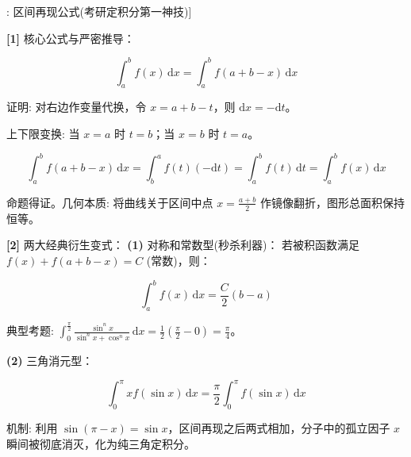 \documentclass[11pt,a4paper,UTF8]{ctexart}
\begin{document}
\begin{thmbox}[定理[3]: 区间再现公式(考研定积分第一神技)]

\textbf{[1]} 核心公式与严密推导：

\begin{equation*}
\int_a^b f(x)\,\mathrm{d}x = \int_a^b f(a+b-x)\,\mathrm{d}x
\end{equation*}


证明: 对右边作变量代换，令 $x = a+b-t$，则 $\mathrm{d}x = -\mathrm{d}t$。

上下限变换: 当 $x=a$ 时 $t=b$；当 $x=b$ 时 $t=a$。


\begin{equation*}
\int_a^b f(a+b-x)\,\mathrm{d}x = \int_b^a f(t)(-\mathrm{d}t) = \int_a^b f(t)\,\mathrm{d}t = \int_a^b f(x)\,\mathrm{d}x
\end{equation*}


命题得证。几何本质: 将曲线关于区间中点 $x = \frac{a+b}{2}$ 作镜像翻折，图形总面积保持恒等。

\textbf{[2]} 两大经典衍生变式：
\textbf{(1)}  对称和常数型(秒杀利器)：
若被积函数满足 $f(x) + f(a+b-x) = C$ (常数)，则：


\begin{equation*}
\int_a^b f(x)\,\mathrm{d}x = \frac{C}{2}(b - a)
\end{equation*}


典型考题: $\int_0^{\frac{\pi}{2}} \frac{\sin^n x}{\sin^n x + \cos^n x}\,\mathrm{d}x = \frac{1}{2}\left(\frac{\pi}{2} - 0\right) = \frac{\pi}{4}$。

\textbf{(2)}  三角消元型：

\begin{equation*}
\int_0^\pi x f(\sin x)\,\mathrm{d}x = \frac{\pi}{2}\int_0^\pi f(\sin x)\,\mathrm{d}x
\end{equation*}


机制: 利用 $\sin(\pi - x) = \sin x$，区间再现之后两式相加，分子中的孤立因子 $x$ 瞬间被彻底消灭，化为纯三角定积分。

\end{thmbox}
\end{document}
